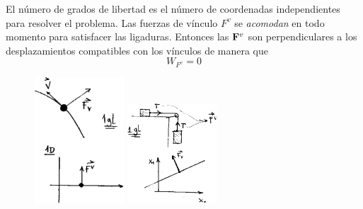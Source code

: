 \documentclass[10pt,oneside]{CBFT_book}
\begin{document}
El número de grados de libertad es el número de coordenadas independientes para resolver el problema.
Las fuerzas de vínculo $F^v$ se {\it acomodan} en todo momento para satisfacer las ligaduras.
Entonces las $\vb{F}^v$ son perpendiculares a los desplazamientos compatibles con los vínculos de
manera que 
\[
	W_{F^v} = 0
\]
\begin{figure}[hbt]
	\begin{center}
	\includegraphics[width=0.3\textwidth]{images/fig_mc_vinculos1.pdf}	 
	\includegraphics[width=0.3\textwidth]{images/fig_mc_vinculos2.pdf}
	\end{center}
	\caption{}
\end{figure} 
\end{document}

